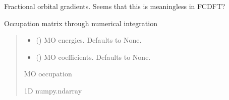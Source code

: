 \documentclass[letterpaper,10pt,english]{sphinxmanual}
\begin{document}

\begin{fulllineitems}
\label{\detokenize{fcdft.wbl:fcdft.wbl.rks.get_grad}}
\pysigstartsignatures
\pysiglinewithargsret
{}
{\sphinxparamcomma {}\sphinxparamcomma {}}
{}
\pysigstopsignatures
\sphinxAtStartPar
Fractional orbital gradients. Seems that this is meaningless in FC\sphinxhyphen{}DFT?

\end{fulllineitems}


\begin{fulllineitems}
\label{\detokenize{fcdft.wbl:fcdft.wbl.rks.get_occ}}
\pysigstartsignatures
\pysiglinewithargsret
{}
{\sphinxparamcomma {}\sphinxparamcomma {}}
{}
\pysigstopsignatures
\sphinxAtStartPar
Occupation matrix through numerical integration
\begin{quote}\begin{description}
\begin{itemize}
\item {} 
\sphinxAtStartPar
{} (\sphinxstyleliteralemphasis{\sphinxupquote{, }}) \textendash{} MO energies. Defaults to None.

\item {} 
\sphinxAtStartPar
{} (\sphinxstyleliteralemphasis{\sphinxupquote{, }}) \textendash{} MO coefficients. Defaults to None.

\end{itemize}

\sphinxAtStartPar
MO occupation

\sphinxAtStartPar
1D numpy.ndarray

\end{description}\end{quote}

\end{fulllineitems}
\end{document}
